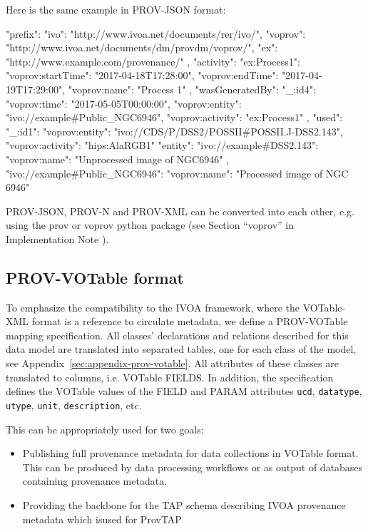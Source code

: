 \noindent
Here is the same example in PROV-JSON format:
\begin{verbnobox}[\scriptsize]
{
  "prefix": {
    "ivo": "http://www.ivoa.net/documents/rer/ivo/",
    "voprov": "http://www.ivoa.net/documents/dm/provdm/voprov/",
    "ex": "http://www.example.com/provenance/"
  },
  "activity": {
    "ex:Process1": {
      "voprov:startTime": "2017-04-18T17:28:00",
      "voprov:endTime": "2017-04-19T17:29:00",
      "voprov:name": "Process 1"
    }
  },
  "wasGeneratedBy": {
    "_:id4": {
      "voprov:time": "2017-05-05T00:00:00",
      "voprov:entity": "ivo://example#Public_NGC6946",
      "voprov:activity": "ex:Process1"
    }
  },
  "used": {
    "_:id1": {
      "voprov:entity": "ivo://CDS/P/DSS2/POSSII#POSSII.J-DSS2.143",
      "voprov:activity": "hips:AlaRGB1"
    }
  }
  "entity": {
    "ivo://example#DSS2.143": {
      "voprov:name": "Unprocessed image of NGC6946"
    },
    "ivo://example#Public_NGC6946": {
      "voprov:name": "Processed image of NGC 6946"
    }
  }
}
\end{verbnobox}
\noindent
PROV-JSON, PROV-N and PROV-XML can be converted into each other, e.g.  using the prov or voprov python package (see Section ``voprov'' in Implementation Note \citep{std:ProvenanceImplementationNote}).

\subsection{PROV-VOTable format} 
To emphasize the compatibility to the IVOA framework, where the VOTable-XML
format is a reference to circulate metadata, we define a PROV-VOTable mapping
specification. All classes' declarations and relations described for this data model are translated into separated tables, one for each class of the model, see
Appendix~\ref{sec:appendix-prov-votable}. All attributes of these classes are
translated to columns, i.e. VOTable FIELDS. In addition, the specification
defines the VOTable values of the FIELD and PARAM attributes \texttt{ucd},
\texttt{datatype}, \texttt{utype}, \texttt{unit}, \texttt{description}, etc.

This can be appropriately used for two goals:
\begin{itemize}
	\item Publishing full provenance metadata for data collections in VOTable format. This can be produced by data processing workflows or as output of databases containing provenance metadata.
	\item Providing the backbone for the TAP schema describing IVOA provenance metadata which isused for ProvTAP 
\end{itemize}

